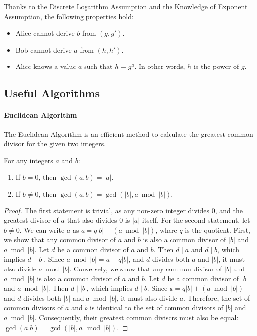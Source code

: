 \documentclass{article}
\begin{document}
Thanks to the Discrete Logarithm Assumption and the Knowledge of Exponent Assumption, the following properties hold:
\begin{itemize}
\item Alice cannot derive $b$ from $(g, g')$.
\item Bob cannot derive $a$ from $(h, h')$.
\item Alice knows a value $a$ such that $h = g^a$. In other words, $h$ is the power of $g$.
\end{itemize}

\subsection{Useful Algorithms}

\paragraph{Euclidean Algorithm}

The Euclidean Algorithm is an efficient method to calculate the greatest common divisor for the given two integers.

\begin{theorem}{}{}
For any integers $a$ and $b$:
\begin{enumerate}
\item If $b = 0$, then $\gcd(a, b) = |a|$.
\item If $b \neq 0$, then $\gcd(a, b) = \gcd(|b|, a \bmod |b|)$.
\end{enumerate}
\end{theorem}

\begin{proof}

The first statement is trivial, as any non-zero integer divides 0, and the greatest divisor of $a$ that also divides 0 is $|a|$ itself.
For the second statement, let $b \neq 0$. We can write $a$ as $a = q|b| + (a \bmod |b|)$, where $q$ is the quotient.
First, we show that any common divisor of $a$ and $b$ is also a common divisor of $|b|$ and $a \bmod |b|$. Let $d$ be a common divisor of $a$ and $b$. Then $d \mid a$ and $d \mid b$, which implies $d \mid |b|$. Since $a \bmod |b| = a - q|b|$, and $d$ divides both $a$ and $|b|$, it must also divide $a \bmod |b|$.
Conversely, we show that any common divisor of $|b|$ and $a \bmod |b|$ is also a common divisor of $a$ and $b$. Let $d$ be a common divisor of $|b|$ and $a \bmod |b|$. Then $d \mid |b|$, which implies $d \mid b$. Since $a = q|b| + (a \bmod |b|)$ and $d$ divides both $|b|$ and $a \bmod |b|$, it must also divide $a$.
Therefore, the set of common divisors of $a$ and $b$ is identical to the set of common divisors of $|b|$ and $a \bmod |b|$. Consequently, their greatest common divisors must also be equal: $\gcd(a. b) = \gcd(|b|, a \mod |b|)$.
\end{proof}
\end{document}
